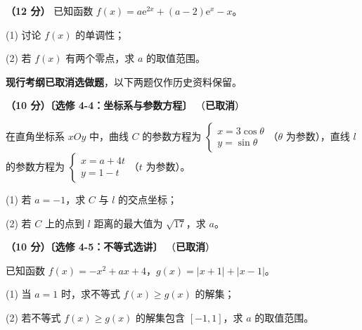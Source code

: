 \begin{question}
\textbf{（12 分）} 已知函数 $f(x)=a\mathrm e^{2x}+(a-2)\mathrm e^{x}-x$。

  (1) 讨论 $f(x)$ 的单调性；

  (2) 若 $f(x)$ 有两个零点，求 $a$ 的取值范围。

\par\medskip

\end{question}

\begin{gktip}
\textbf{ 现行考纲已取消选做题}，以下两题仅作历史资料保留。
\end{gktip}

\begin{question}
\textbf{（10 分）〔选修 4-4：坐标系与参数方程〕} （\textbf{已取消}）

在直角坐标系 $xOy$ 中，曲线 $C$ 的参数方程为 $\begin{cases}x=3\cos\theta\\ y=\sin\theta\end{cases}$（$\theta$ 为参数），直线 $l$ 的参数方程为 $\begin{cases}x=a+4t\\ y=1-t\end{cases}$（$t$ 为参数）。

  (1) 若 $a=-1$，求 $C$ 与 $l$ 的交点坐标；

  (2) 若 $C$ 上的点到 $l$ 距离的最大值为 $\sqrt{17}$，求 $a$。

\end{question}
\begin{question}
\textbf{（10 分）〔选修 4-5：不等式选讲〕} （\textbf{已取消}）

已知函数 $f(x)=-x^{2}+ax+4$，$g(x)=|x+1|+|x-1|$。

  (1) 当 $a=1$ 时，求不等式 $f(x)\ge g(x)$ 的解集；

  (2) 若不等式 $f(x)\ge g(x)$ 的解集包含 $[-1,1]$，求 $a$ 的取值范围。

\par\medskip


\end{question}